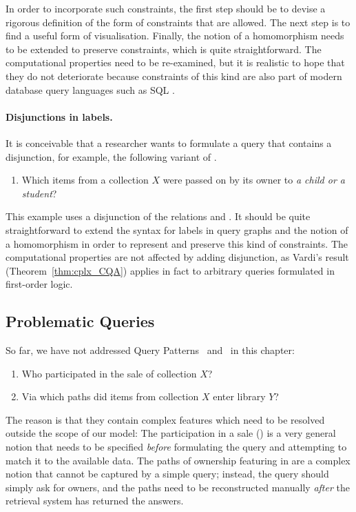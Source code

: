 In order to incorporate such constraints,
the first step should be to devise a rigorous definition of the form of constraints that are allowed.
The next step is to find a useful form of visualisation.
Finally, the notion of a homomorphism needs to be extended to preserve constraints,
which is quite straightforward.
The computational properties need to be re-examined, but it is realistic to hope
that they do not deteriorate because constraints of this kind are also part of
modern database query languages such as SQL \autocite{SQL}.

\paragraph{Disjunctions in labels.}

It is conceivable that a researcher wants to formulate a query that contains a disjunction,
for example, the following variant of .
%
\begin{enumerate}
  \item[\exaquery{4$'$}]
    Which items from a collection $X$ were passed on by its owner to \emph{a child or a student}?
\end{enumerate}
%
This example uses a disjunction of the relations  and .
It should be quite straightforward to extend the syntax for labels in query graphs
and the notion of a homomorphism in order to represent and preserve this kind of constraints.
The computational properties are not affected by adding disjunction,
as Vardi's result (Theorem~\ref{thm:cplx_CQA}) applies in fact to arbitrary queries formulated in first-order logic.

\subsection{Problematic Queries}

So far, we have not addressed Query Patterns~ and~ in this chapter:
%
\begin{enumerate}
  \item[\exaquery{6}]
    Who participated in the sale of collection $X$?
  \item[\exaquery{7}]
    Via which paths did items from collection $X$ enter library $Y$?
\end{enumerate}
%
The reason is that they contain complex features which need to be resolved outside the scope of our model:
The participation in a sale () is a very general notion that needs to be specified
\emph{before} formulating the query and attempting to match it to the available data.
The paths of ownership featuring in  are a complex notion that cannot be captured by a simple query;
instead, the query should simply ask for owners, and the paths need to be reconstructed manually
\emph{after} the retrieval system has returned the answers.

